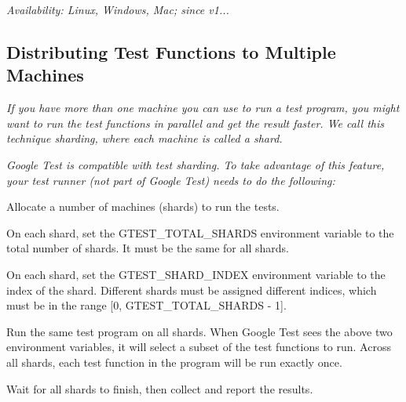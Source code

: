 {\itshape {\itshape Availability\+:} Linux, Windows, Mac; since v1...}

{\itshape \subsection*{Distributing Test Functions to Multiple Machines}}

{\itshape }

{\itshape If you have more than one machine you can use to run a test program, you might want to run the test functions in parallel and get the result faster. We call this technique {\itshape sharding}, where each machine is called a {\itshape shard}.}

{\itshape Google Test is compatible with test sharding. To take advantage of this feature, your test runner (not part of Google Test) needs to do the following\+:}

{\itshape 
\begin{DoxyEnumerate}
\item Allocate a number of machines (shards) to run the tests.
\end{DoxyEnumerate}
\begin{DoxyEnumerate}
\item On each shard, set the {\ttfamily G\+T\+E\+S\+T\+\_\+\+T\+O\+T\+A\+L\+\_\+\+S\+H\+A\+R\+DS} environment variable to the total number of shards. It must be the same for all shards.
\end{DoxyEnumerate}
\begin{DoxyEnumerate}
\item On each shard, set the {\ttfamily G\+T\+E\+S\+T\+\_\+\+S\+H\+A\+R\+D\+\_\+\+I\+N\+D\+EX} environment variable to the index of the shard. Different shards must be assigned different indices, which must be in the range {\ttfamily \mbox{[}0, G\+T\+E\+S\+T\+\_\+\+T\+O\+T\+A\+L\+\_\+\+S\+H\+A\+R\+DS -\/ 1\mbox{]}}.
\end{DoxyEnumerate}
\begin{DoxyEnumerate}
\item Run the same test program on all shards. When Google Test sees the above two environment variables, it will select a subset of the test functions to run. Across all shards, each test function in the program will be run exactly once.
\end{DoxyEnumerate}
\begin{DoxyEnumerate}
\item Wait for all shards to finish, then collect and report the results.
\end{DoxyEnumerate}}

